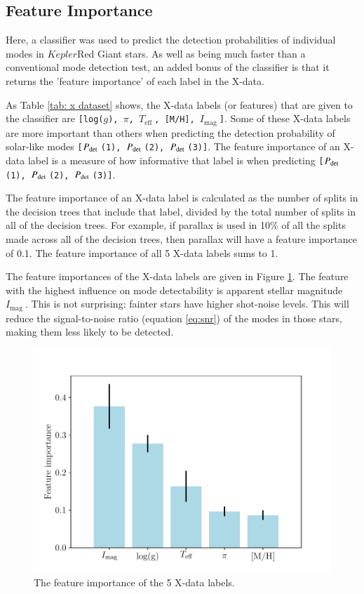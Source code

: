\documentclass[a4paper,fleqn,usenatbib,useAMS]{mnras}
\newcommand{\teff}{\ensuremath{T_{\textrm{eff}}\:}}
\newcommand{\kep}{\ensuremath{Kepler}\:}
\newcommand{\pdet}{\ensuremath{P_{\rm det}\:}}
\newcommand{\imag}{\ensuremath{I_{\textrm{mag}}\:}}
\begin{document}
\subsection{Feature Importance}
\label{sect: feature importance}

Here, a classifier was used to predict the detection probabilities of individual modes in \kep Red Giant stars. As well as being much faster than a conventional mode detection test, an added bonus of the classifier is that it returns the 'feature importance' of each label in the X-data.

As Table \ref{tab: x dataset} shows, the X-data labels (or features) that are given to the classifier are \texttt{[log($g$), $\pi$, \teff, [M/H], \imag]}. Some of these X-data labels are more important than others when predicting the detection probability of solar-like modes \texttt{[\pdet(1), \pdet(2), \pdet(3)]}. The feature importance of an X-data label is a measure of how informative that label is when predicting \texttt{[\pdet(1), \pdet(2), \pdet(3)]}.

The feature importance of an X-data label is calculated as the number of splits in the decision trees that include that label, divided by the total number of splits in all of the decision trees. For example, if parallax is used in 10\% of all the splits made across all of the decision trees, then parallax will have a feature importance of 0.1. The feature importance of all 5 X-data labels sums to 1.

The feature importances of the X-data labels are given in Figure \ref{fig:feature}. The feature with the highest influence on mode detectability is apparent stellar magnitude \imag. This is not surprising: fainter stars have higher shot-noise levels. This will reduce the signal-to-noise ratio (equation \ref{eq:snr}) of the modes in those stars, making them less likely to be detected.
\begin{figure}
	\centering
	\includegraphics[scale=0.5]{Plot1_featureimportance.pdf}
	\caption{The feature importance of the 5 X-data labels.}	
	\label{fig:feature}
\end{figure}
\end{document}
